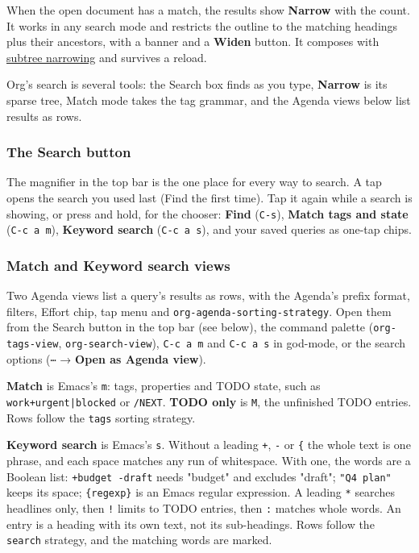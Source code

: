 \documentclass[11pt]{article}
\begin{document}
When the open document has a match, the results show \textbf{Narrow} with the count. It works in any search mode and restricts the outline to the matching headings plus their ancestors, with a banner and a \textbf{Widen} button. It composes with \hyperref[sec:org4bc1b50]{subtree narrowing} and survives a reload.

Org's search is several tools: the Search box finds as you type, \textbf{Narrow} is its sparse tree, Match mode takes the tag grammar, and the Agenda views below list results as rows.

\subsubsection{The Search button}
\label{sec:orgfd3aabe}
The magnifier in the top bar is the one place for every way to search. A tap opens the search you used last (Find the first time). Tap it again while a search is showing, or press and hold, for the chooser: \textbf{Find} (\texttt{C-s}), \textbf{Match tags and state} (\texttt{C-c a m}), \textbf{Keyword search} (\texttt{C-c a s}), and your saved queries as one-tap chips.

\subsubsection{Match and Keyword search views}
\label{sec:orge4d4453}
Two Agenda views list a query's results as rows, with the Agenda's prefix format, filters, Effort chip, tap menu and \texttt{org-agenda-sorting-strategy}. Open them from the Search button in the top bar (see below), the command palette (\texttt{org-tags-view}, \texttt{org-search-view}), \texttt{C-c a m} and \texttt{C-c a s} in god-mode, or the search options (\texttt{⋯} → \textbf{Open as Agenda view}).

\textbf{Match} is Emacs's \texttt{m}: tags, properties and TODO state, such as \texttt{work+urgent|blocked} or \texttt{/NEXT}. \textbf{TODO only} is \texttt{M}, the unfinished TODO entries. Rows follow the \texttt{tags} sorting strategy.

\textbf{Keyword search} is Emacs's \texttt{s}. Without a leading \texttt{+}, \texttt{-} or \texttt{\{} the whole text is one phrase, and each space matches any run of whitespace. With one, the words are a Boolean list: \texttt{+budget -draft} needs "budget" and excludes "draft"; \texttt{"Q4 plan"} keeps its space; \texttt{\{regexp\}} is an Emacs regular expression. A leading \texttt{*} searches headlines only, then \texttt{!} limits to TODO entries, then \texttt{:} matches whole words. An entry is a heading with its own text, not its sub-headings. Rows follow the \texttt{search} strategy, and the matching words are marked.
\end{document}
